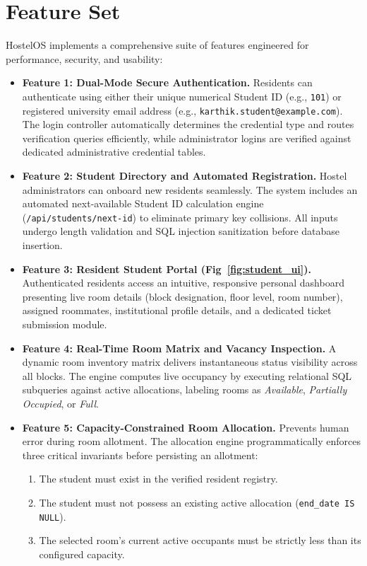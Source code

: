 \documentclass[12pt,a4paper]{article}
\begin{document}
\section{Feature Set}
\label{sec:features}
HostelOS implements a comprehensive suite of features engineered for performance, security, and usability:

\begin{itemize}
    \item \textbf{Feature 1: Dual-Mode Secure Authentication.}
    Residents can authenticate using either their unique numerical Student ID (e.g., \texttt{101}) or registered university email address (e.g., \texttt{karthik.student@example.com}). The login controller automatically determines the credential type and routes verification queries efficiently, while administrator logins are verified against dedicated administrative credential tables.
    
    \item \textbf{Feature 2: Student Directory and Automated Registration.}
    Hostel administrators can onboard new residents seamlessly. The system includes an automated next-available Student ID calculation engine (\texttt{/api/students/next-id}) to eliminate primary key collisions. All inputs undergo length validation and SQL injection sanitization before database insertion.
    
    \item \textbf{Feature 3: Resident Student Portal (Fig~\ref{fig:student_ui}).}
    Authenticated residents access an intuitive, responsive personal dashboard presenting live room details (block designation, floor level, room number), assigned roommates, institutional profile details, and a dedicated ticket submission module.
    
    \item \textbf{Feature 4: Real-Time Room Matrix and Vacancy Inspection.}
    A dynamic room inventory matrix delivers instantaneous status visibility across all blocks. The engine computes live occupancy by executing relational SQL subqueries against active allocations, labeling rooms as \textit{Available}, \textit{Partially Occupied}, or \textit{Full}.
    
    \item \textbf{Feature 5: Capacity-Constrained Room Allocation.}
    Prevents human error during room allotment. The allocation engine programmatically enforces three critical invariants before persisting an allotment:
    \begin{enumerate}
        \item The student must exist in the verified resident registry.
        \item The student must not possess an existing active allocation (\texttt{end\_date IS NULL}).
        \item The selected room's current active occupants must be strictly less than its configured capacity.
    \end{enumerate}


\end{itemize}
\end{document}

